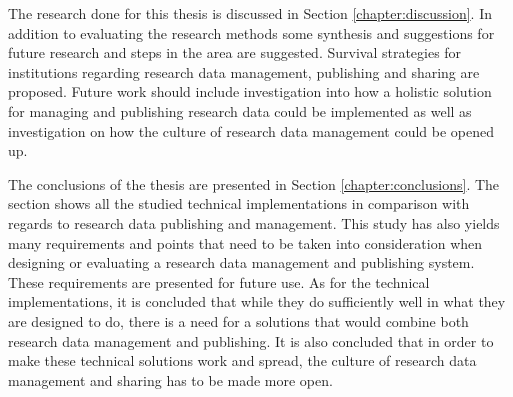 The research done for this thesis is discussed in Section
\ref{chapter:discussion}. In addition to evaluating the research methods
some synthesis and suggestions for future research and steps in the area
are suggested. Survival strategies for institutions regarding research data
management, publishing and sharing are proposed. Future work should include investigation into how a
holistic solution for managing and publishing research data could be
implemented as well as investigation on how the culture of research data
management could be opened up.

The conclusions of the thesis are presented in Section
\ref{chapter:conclusions}. The section shows all the studied technical
implementations in comparison with regards to research data publishing
and management. This study has also yields many requirements and points
that need to be taken into consideration when designing or evaluating a
research data management and publishing system. These requirements are
presented for future use. As for the technical implementations, it is
concluded that while they do sufficiently well in what they are designed to
do, there is a need for a solutions that would combine both research data
management and publishing. It is also concluded that in order to make these
technical solutions work and spread, the culture of research data management and sharing
has to be made more open.

\iffalse
This is the introduction chapter - it will contain the following things.

\begin{itemize}
    \item general introduction to the subject
    \item general background
    \item objectives for the maste'r thesis
    \item the main research question - how to share research data?
    \begin{itemize}
        \item how to do it?
        \item how is it being done at the moment=
    \end{itemize}
    \item subproblems
    \begin{itemize}
        \item technical
        \item cultural
        \item organizational
    \end{itemize}
    \item what this thesis covers and what it does not cover
    \item positioning the work and how it's connected to other work
    \item important concepts
    \item the structure of the thesis
\end{itemize}
\fi
